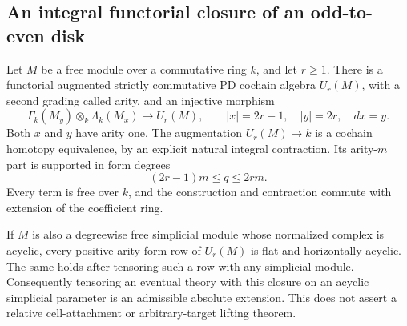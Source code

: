 \subsection{An integral functorial closure of an odd-to-even disk}

\begin{theorem}
\label{sa08:D029}
Let \(M\) be a free module over a commutative ring \(k\),
and let \(r\ge1\). There is a functorial augmented strictly
commutative PD cochain algebra \(U_r(M)\), with a second
grading called arity, and an injective morphism
\[
 \Gamma_k(M_y)\otimes_k\Lambda_k(M_x)
       \longrightarrow U_r(M),
 \qquad |x|=2r-1,\quad |y|=2r,\quad dx=y.
 \tag{D-29a}
\]
Both \(x\) and \(y\) have arity one. The augmentation
\(U_r(M)\to k\) is a cochain homotopy equivalence, by
an explicit natural integral contraction. Its arity-\(m\)
part is supported in form degrees
\[
                  (2r-1)m\le q\le2rm.
 \tag{D-29b}
\]
Every term is free over \(k\), and the construction and
contraction commute with extension of the coefficient ring.

If \(M\) is also a degreewise free simplicial module
whose normalized complex is acyclic, every positive-arity
form row of \(U_r(M)\) is flat and horizontally acyclic.
The same holds after tensoring such a row with any
simplicial module. Consequently tensoring an eventual
theory with this closure on an acyclic simplicial parameter
is an admissible absolute extension. This does not assert
a relative cell-attachment or arbitrary-target lifting theorem.
\end{theorem}

